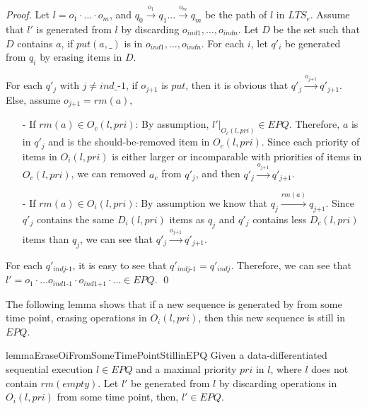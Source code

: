 \begin {proof}
Let $l=o_1 \cdot \ldots \cdot o_m$, and $q_0 \xrightarrow{o_1} q_1 \ldots \xrightarrow{o_m} q_m$ be the path of $l$ in $\textit{LTS}_e$. Assume that $l'$ is generated from $l$ by discarding $o_{\textit{ind1}},\ldots,o_{\textit{indn}}$. Let $D$ be the set such that $D$ contains $a$, if $\textit{put}(a,\_)$ is in $o_{\textit{ind1}},\ldots,o_{\textit{indn}}$. For each $i$, let $q'_i$ be generated from $q_i$ by erasing items in $D$.

For each $q'_j$ with $j \neq \textit{ind}\_\textit{-1}$, if $o_{\textit{j+1}}$ is $\textit{put}$, then it is obvious that $q'_j \xrightarrow{o_{\textit{j+1}}} q'_{\textit{j+1}}$. Else, assume $o_{\textit{j+1}} = \textit{rm}(a)$,

\begin{itemize}
\setlength{\itemsep}{0.5pt}
\item[-] If $\textit{rm}(a) \in O_c(l,\textit{pri})$: By assumption, $l' \vert_{ O_c(l,\textit{pri}) } \in \textit{EPQ}$. Therefore, $a$ is in $q'_j$ and is the should-be-removed item in $O_c(l,\textit{pri})$. Since each priority of items in $O_i(l,\textit{pri})$ is either larger or incomparable with priorities of items in $O_c(l,\textit{pri})$, we can removed $a_c$ from $q'_j$, and then $q'_j \xrightarrow{o_{\textit{j+1}}} q'_{\textit{j+1}}$.

\item[-] If $\textit{rm}(a) \in O_i(l,\textit{pri})$: By assumption we know that $q_j \xrightarrow{\textit{rm}(a)} q_{\textit{j+1}}$. Since $q'_j$ contains the same $D_i(l,\textit{pri})$ items as $q_j$ and $q'_j$ contains less $D_c(l,\textit{pri})$ items than $q_j$, we can see that $q'_j \xrightarrow{o_{\textit{j+1}}} q'_{\textit{j+1}}$.
\end{itemize}

For each $q'_{\textit{indj-1}}$, it is easy to see that $q'_{\textit{indj-1}} = q'_{\textit{indj}}$. Therefore, we can see that $l' = o_1 \cdot \ldots o_{\textit{ind1-1}} \cdot o_{\textit{ind1+1}} \cdot \ldots \in \textit{EPQ}$. \qed
\end {proof}


The following lemma shows that if a new sequence is generated by from some time point, erasing operations in $O_i(l,\textit{pri})$, then this new sequence is still in $\textit{EPQ}$.

\begin{restatable}{lemma}{EraseOiFromSomeTimePointStillinEPQ}
\label{lemma:erase Oi from some time point still in EPQ}
Given a data-differentiated sequential execution $l \in \textit{EPQ}$ and a maximal priority $\textit{pri}$ in $l$, where $l$ does not contain $\textit{rm}(\textit{empty})$. Let $l'$ be generated from $l$ by discarding operations in $O_i(l,\textit{pri})$ from some time point, then, $l' \in \textit{EPQ}$.
\end{restatable}

